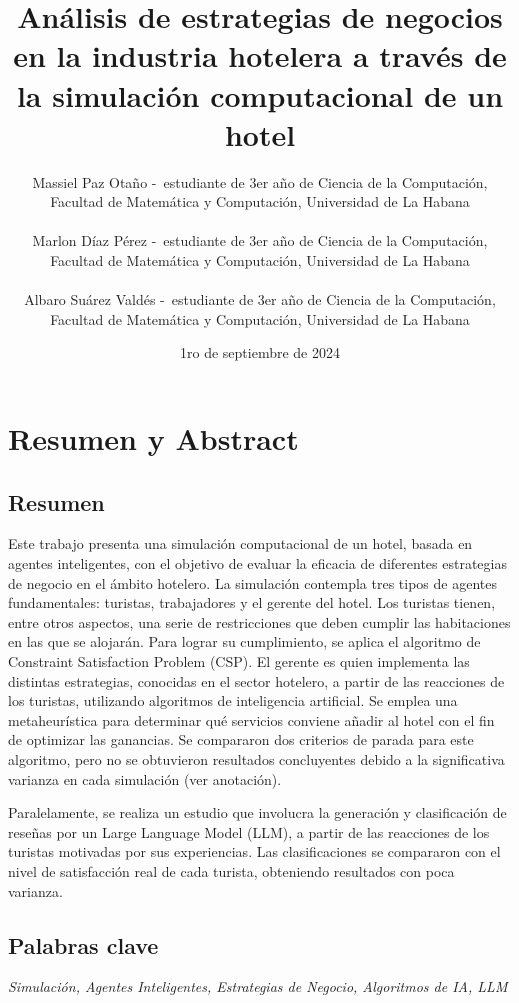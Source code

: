 \documentclass[12pt,a4paper]{article} \usepackage[spanish]{babel} \usepackage{graphicx} \usepackage{amsmath} \usepackage{amsfonts} \usepackage{amssymb} \usepackage{float} \usepackage{geometry}
\title{\textbf{Análisis de estrategias de negocios en la industria hotelera a través de la simulación computacional de un hotel}}
\author{Massiel Paz Otaño -\ estudiante de 3er año de Ciencia de la Computación, \\ Facultad de Matemática y Computación, Universidad de La Habana\\\\ Marlon Díaz Pérez -\ estudiante de 3er año de Ciencia de la Computación, \\ Facultad de Matemática y Computación, Universidad de La Habana\\\\ Albaro Suárez Valdés -\ estudiante de 3er año de Ciencia de la Computación, \\ Facultad de Matemática y Computación, Universidad de La Habana} \date{1ro de septiembre de 2024}
\begin{document}
\maketitle

\vspace{-1em} \hrulefill

\section*{Resumen y Abstract}

\subsection*{Resumen} 

Este trabajo presenta una simulación computacional de un hotel, basada en agentes inteligentes, con el objetivo de evaluar la eficacia de diferentes estrategias de negocio en el ámbito hotelero. La simulación contempla tres tipos de agentes fundamentales: turistas, trabajadores y el gerente del hotel. Los turistas tienen, entre otros aspectos, una serie de restricciones que deben cumplir las habitaciones en las que se alojarán. Para lograr su cumplimiento, se aplica el algoritmo de Constraint Satisfaction Problem (CSP). El gerente es quien implementa las distintas estrategias, conocidas en el sector hotelero, a partir de las reacciones de los turistas, utilizando algoritmos de inteligencia artificial. Se emplea una metaheurística para determinar qué servicios conviene añadir al hotel con el fin de optimizar las ganancias. Se compararon dos criterios de parada para este algoritmo, pero no se obtuvieron resultados concluyentes debido a la significativa varianza en cada simulación (ver anotación).

Paralelamente, se realiza un estudio que involucra la generación y clasificación de reseñas por un Large Language Model (LLM), a partir de las reacciones de los turistas motivadas por sus experiencias. Las clasificaciones se compararon con el nivel de satisfacción real de cada turista, obteniendo resultados con poca varianza.

\subsection*{Palabras clave} \textit{Simulación, Agentes Inteligentes, Estrategias de Negocio, Algoritmos de IA, LLM}
\end{document}

